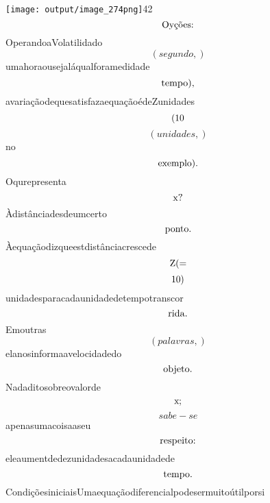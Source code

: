 \documentclass{article}
\begin{document}
\begin{equation}
\end{equation}\texttt{[image: output/image\_274png]}42\begin{equation}
$Oyções:$
\end{equation}OperandoaVolatilidado\begin{equation}
\left( segundo,\right)
\end{equation}umahoraousejaláqualforamedidade\begin{equation}
$tempo),$
\end{equation}avariaçãodequesatisfazaequaçãoédeZunidades\begin{equation}
$(10$
\end{equation}\begin{equation}
\left( unidades,\right)
\end{equation}no\begin{equation}
$exemplo).$
\end{equation}Oqurepresenta\begin{equation}
$x?$
\end{equation}Àdistânciadesdeumcerto\begin{equation}
$ponto.$
\end{equation}Àequaçãodizqueestdistânciacrescede\begin{equation}
$Z(=$
\end{equation}\begin{equation}
$10)$
\end{equation}unidadesparacadaunidadedetempotranscor\begin{equation}
$rida.$
\end{equation}Emoutras\begin{equation}
\left( palavras,\right)
\end{equation}elanosinformaavelocidadedo\begin{equation}
$objeto.$
\end{equation}Nadaditosobreovalorde\begin{equation}
$x;$
\end{equation}\begin{equation}
sabe - se
\end{equation}apenasumacoisaaseu\begin{equation}
$respeito:$
\end{equation}eleaumentdedezunidadesacadaunidadede\begin{equation}
$tempo.$
\end{equation}CondiçõesiniciaisUmaequaçãodiferencialpodesermuitoútilporsi\begin{equation}

\end{equation}
\end{document}
